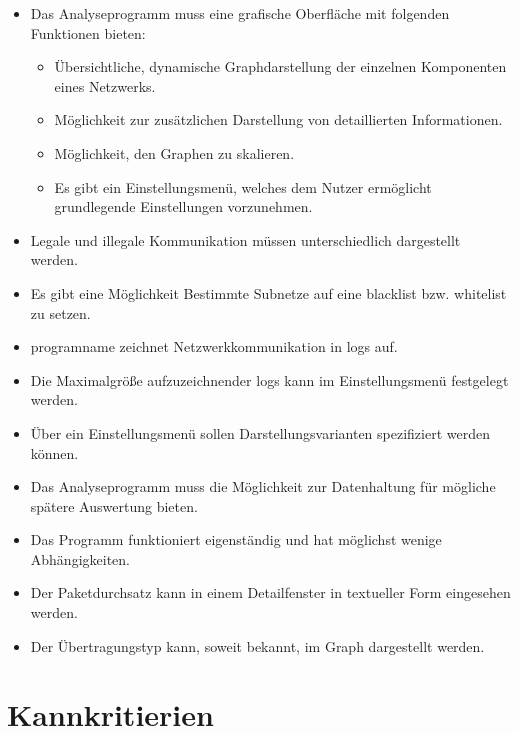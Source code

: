 \begin{itemize}
\item Das Analyseprogramm muss eine grafische Oberfläche mit folgenden Funktionen bieten:

	\begin{itemize}
    \item Übersichtliche, dynamische Graphdarstellung der einzelnen Komponenten eines Netzwerks.

    \item Möglichkeit zur zusätzlichen Darstellung von detaillierten Informationen.

    \item Möglichkeit, den Graphen zu skalieren.

    \item Es gibt ein Einstellungsmenü, welches dem Nutzer ermöglicht grundlegende Einstellungen vorzunehmen.
    \end{itemize}

\item Legale und illegale Kommunikation müssen unterschiedlich dargestellt werden.

\item Es gibt eine Möglichkeit Bestimmte Subnetze auf eine \gls{blacklist} bzw. \gls{whitelist} zu setzen.

\item \gls{programname} zeichnet Netzwerkkommunikation in \glspl{log} auf.

\item Die Maximalgröße aufzuzeichnender \glspl{log} kann im Einstellungsmenü festgelegt werden.

\item Über ein Einstellungsmenü sollen Darstellungsvarianten spezifiziert werden können.

\item Das Analyseprogramm muss die Möglichkeit zur Datenhaltung für mögliche spätere Auswertung bieten.

\item Das Programm funktioniert eigenständig und hat möglichst wenige Abhängigkeiten.

\item Der Paketdurchsatz kann in einem Detailfenster in textueller Form eingesehen werden.

\item Der Übertragungstyp kann, soweit bekannt, im Graph dargestellt werden.
\end{itemize}

\section{Kannkritierien}

